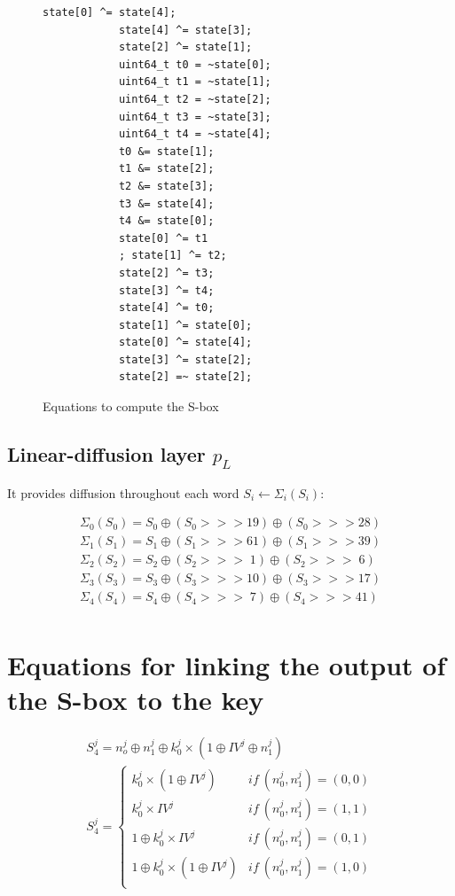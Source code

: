 \documentclass[a4paper,11pt,twocolumn]{article}
\begin{document}
		\begin{figure}[H]
			\centering
			\begin{lstlisting}[style=CStyle]
			state[0] ^= state[4];
			state[4] ^= state[3];
			state[2] ^= state[1];
			uint64_t t0 = ~state[0];
			uint64_t t1 = ~state[1];
			uint64_t t2 = ~state[2];
			uint64_t t3 = ~state[3];
			uint64_t t4 = ~state[4];
			t0 &= state[1];
			t1 &= state[2];
			t2 &= state[3];
			t3 &= state[4];
			t4 &= state[0];
			state[0] ^= t1
			; state[1] ^= t2;
			state[2] ^= t3;
			state[3] ^= t4;
			state[4] ^= t0;
			state[1] ^= state[0];
			state[0] ^= state[4];
			state[3] ^= state[2];
			state[2] =~ state[2];
			\end{lstlisting}
			\caption{Equations to compute the S-box}
			\label{equations_sbox}
		\end{figure}
		
		\subsection{Linear-diffusion layer $p_L$}
		It provides diffusion throughout each word $S_i \leftarrow \Sigma_i(S_i)$:
		
		\begin{gather*}
			\Sigma_0(S_0) = S_0 \oplus (S_0 >>> 19) \oplus (S_0 >>> 28)\\
			\Sigma_1(S_1) = S_1 \oplus (S_1 >>> 61) \oplus (S_1 >>> 39)\\
			\Sigma_2(S_2) = S_2 \oplus (S_2 >>> \;  1) \oplus (S_2 >>> \; 6)\\
			\Sigma_3(S_3) = S_3 \oplus (S_3 >>> 10) \oplus (S_3 >>> 17)\\
			\Sigma_4(S_4) = S_4 \oplus (S_4 >>> \; 7) \oplus (S_4 >>> 41)\\
		\end{gather*}
		
		\section{Equations for linking the output of the S-box to the key} \label{equations}
		\begin{gather*}
			S_4^j = n_o^j \oplus n_1^j \oplus k_0^j \times (1 \oplus IV^j \oplus n_1^j)\\
			S _4^j =\left \{	
				\begin{array}{ll}
					k_0^j \times (1 \oplus IV^j) & if\ (n_0^j,n_1^j)=(0,0)\\
					k_0^j \times IV^j & if\ (n_0^j,n_1^j)=(1,1)\\
					1 \oplus k_0^j \times IV^j & if\ (n_0^j,n_1^j)=(0,1)\\
					1 \oplus k_0^j \times (1 \oplus IV^j) & if\ (n_0^j,n_1^j)=(1,0)\\
				\end{array}
					\right.
		\end{gather*}
		 
\end{document}
